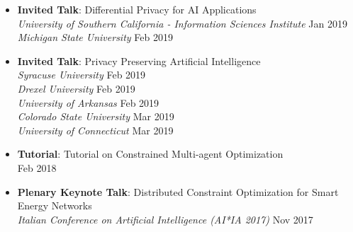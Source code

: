 \begin{itemize}
  \item {\bf Invited Talk}: Differential Privacy for AI Applications\\
  {\em University of Southern California - Information Sciences Institute} \hfill {Jan 2019}\\
  {\em Michigan State University} \hfill {Feb 2019}

  \item {\bf Invited Talk}: Privacy Preserving Artificial Intelligence\\
  {\em Syracuse University} \hfill {Feb 2019}\\
  {\em Drexel University} \hfill {Feb 2019}\\
  {\em University of Arkansas} \hfill {Feb 2019}\\
  {\em Colorado State University} \hfill {Mar 2019}\\
  {\em University of Connecticut} \hfill {Mar 2019}






	\item {\bf Tutorial}: {Tutorial on Constrained Multi-agent Optimization}\\
  	\hfill {Feb 2018}

	\item {\bf Plenary Keynote Talk}: 
	Distributed Constraint Optimization for Smart Energy Networks\\
    {\em Italian Conference on Artificial Intelligence (AI*IA 2017)}
	\hfill {Nov 2017}


\end{itemize}
